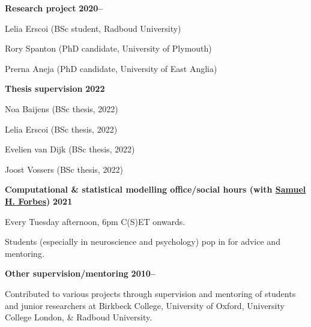 \documentclass[10pt]{article}
\newenvironment{outerlist}[1][\enskip\textbullet]%
        {\begin{itemize}[#1]}{\end{itemize}%
         \vspace{-.6\baselineskip}}
\newenvironment{innerlist}[1][\enskip\textbullet]%
        {\begin{compactitem}[#1]}{\end{compactitem}}
\begin{document}
\begin{outerlist}
 
    \item[\textbf{Research project}] \hfill \textbf{2020--}
      \begin{innerlist}
        \item Lelia Erscoi (BSc student, Radboud University)
        \item Rory Spanton (PhD candidate, University of Plymouth)
        \item Prerna Aneja (PhD candidate, University of East Anglia)
    \end{innerlist}  

  
      \item[\textbf{Thesis supervision}] \hfill \textbf{2022}
      \begin{innerlist}
        \item Noa Baijens (BSc thesis, 2022)
        \item Lelia Erscoi (BSc thesis, 2022)
        \item Evelien van Dijk (BSc thesis, 2022)
        \item Joost Vossers (BSc thesis, 2022)
    \end{innerlist}
    
 
      \item[\textbf{Computational \& statistical modelling office/social hours (with \href{http://samforbes.me/}{Samuel H. Forbes})}] \hfill \textbf{2021}
      \begin{innerlist}
        \item Every Tuesday afternoon, 6pm C(S)ET onwards.
         \item  Students (especially in neuroscience and psychology) pop in for advice and mentoring.

  \end{innerlist}
  
    \item[\textbf{Other supervision/mentoring}] \hfill \textbf{2010--}

      \begin{innerlist}
        \item Contributed to various projects through supervision and mentoring of students and junior researchers at
        Birkbeck College, University of Oxford, University College London, \& Radboud University.

     \end{innerlist}




\end{outerlist}
\end{document}
